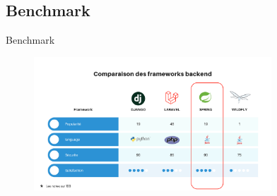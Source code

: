 \documentclass{beamer}
\begin{document}
\subsection{Benchmark}
\begin{frame}{Benchmark}
   \begin{figure}[htpb]
        \centering
        \includegraphics[height=5cm]{pic/benchmark.png}
    \end{figure}
\end{frame}
\end{document}
